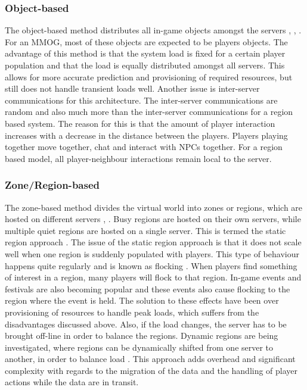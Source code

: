 \documentclass[10pt,a4paper,journal,cspaper,compsoc]{IEEEtran}
\begin{document}
\subsubsection{Object-based}
The object-based method distributes all in-game objects amongst the servers \cite{object_based_consistency1}, \cite{object_based_consistency2},
\cite{object_based_consistency3}. For an MMOG, most of these objects are expected to be players objects. The advantage of this method is that the
system load is fixed for a certain player population and that the load is equally distributed amongst all servers. This allows for more accurate
prediction and provisioning  of required resources, but still does not handle transient loads well. Another issue is inter-server communications for
this architecture. The inter-server communications are random and also much more than the inter-server communications for a region based system. The
reason for this is that the amount of player interaction increases with a decrease in the distance between the players. Players playing together move
together, chat and interact with \acp{NPC} together. For a region based model, all player-neighbour interactions remain local to the server.

\subsubsection{Zone/Region-based}
The zone-based method divides the virtual world into zones or regions, which are hosted on different servers \cite{zone_based_stat},
\cite{zone_based_dyn}. Busy regions are hosted on their own servers, while multiple quiet regions are hosted on a single server. This is termed the
static region approach \cite{zone_based_stat}. The issue of the static region approach is that it does not scale well when one region is suddenly
populated with players. This type of behaviour happens quite regularly and is known as flocking \cite{flocking}. When players find something of
interest in a region, many players will flock to that region. In-game events and festivals are also becoming popular and these events also cause
flocking to the region where the event is held. The solution to these effects have been over provisioning of resources to handle peak loads, which
suffers from the disadvantages discussed above. Also, if the load changes, the server has to be brought off-line in order to balance the regions.
Dynamic regions are being investigated, where regions can be dynamically shifted from one server to another, in order to balance load
\cite{zone_based_dyn}. This approach adds overhead and significant complexity with regards to the migration of the data and the handling of player
actions while the data are in transit.
\end{document}
